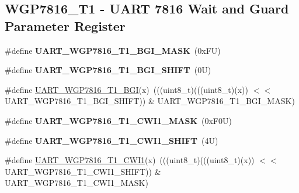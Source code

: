 \subsection*{W\+G\+P7816\+\_\+\+T1 -\/ U\+A\+RT 7816 Wait and Guard Parameter Register}
\begin{DoxyCompactItemize}
\item 
\mbox{\label{group___u_a_r_t___register___masks_ga77fbf8e133f6b1595186d9b53bd60869}} 
\#define {\bfseries U\+A\+R\+T\+\_\+\+W\+G\+P7816\+\_\+\+T1\+\_\+\+B\+G\+I\+\_\+\+M\+A\+SK}~(0x\+F\+U)
\item 
\mbox{\label{group___u_a_r_t___register___masks_gaf770c25336fbb5a17d9a1ac8925bcb41}} 
\#define {\bfseries U\+A\+R\+T\+\_\+\+W\+G\+P7816\+\_\+\+T1\+\_\+\+B\+G\+I\+\_\+\+S\+H\+I\+FT}~(0\+U)
\item 
\#define \mbox{\hyperlink{group___u_a_r_t___register___masks_ga2c8a42e98bc4476d4e926e0be6f9c700}{U\+A\+R\+T\+\_\+\+W\+G\+P7816\+\_\+\+T1\+\_\+\+B\+GI}}(x)~(((uint8\+\_\+t)(((uint8\+\_\+t)(x)) $<$$<$ U\+A\+R\+T\+\_\+\+W\+G\+P7816\+\_\+\+T1\+\_\+\+B\+G\+I\+\_\+\+S\+H\+I\+FT)) \& U\+A\+R\+T\+\_\+\+W\+G\+P7816\+\_\+\+T1\+\_\+\+B\+G\+I\+\_\+\+M\+A\+SK)
\item 
\mbox{\label{group___u_a_r_t___register___masks_ga6980efea83eb7e238b17bbc716949395}} 
\#define {\bfseries U\+A\+R\+T\+\_\+\+W\+G\+P7816\+\_\+\+T1\+\_\+\+C\+W\+I1\+\_\+\+M\+A\+SK}~(0x\+F0\+U)
\item 
\mbox{\label{group___u_a_r_t___register___masks_ga5a75b862a75563f0acdf3ec3c45c4ffc}} 
\#define {\bfseries U\+A\+R\+T\+\_\+\+W\+G\+P7816\+\_\+\+T1\+\_\+\+C\+W\+I1\+\_\+\+S\+H\+I\+FT}~(4\+U)
\item 
\#define \mbox{\hyperlink{group___u_a_r_t___register___masks_gae1898bf4e8ee7c26f4a5529488d5b82d}{U\+A\+R\+T\+\_\+\+W\+G\+P7816\+\_\+\+T1\+\_\+\+C\+W\+I1}}(x)~(((uint8\+\_\+t)(((uint8\+\_\+t)(x)) $<$$<$ U\+A\+R\+T\+\_\+\+W\+G\+P7816\+\_\+\+T1\+\_\+\+C\+W\+I1\+\_\+\+S\+H\+I\+FT)) \& U\+A\+R\+T\+\_\+\+W\+G\+P7816\+\_\+\+T1\+\_\+\+C\+W\+I1\+\_\+\+M\+A\+SK)
\end{DoxyCompactItemize}
